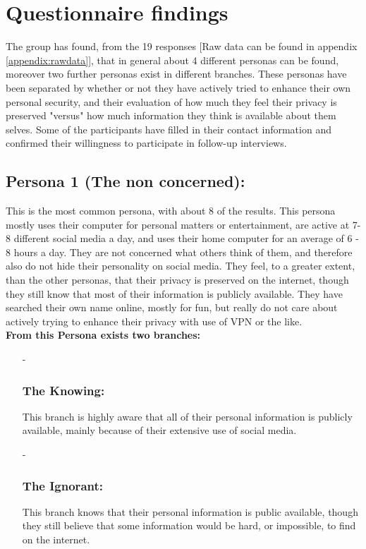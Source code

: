 \section{Questionnaire findings}
The group has found, from the 19 responses  [Raw data can be found in appendix \ref{appendix:rawdata}], that in general about 4 different personas can be found, moreover two further personas exist in different branches. These personas have been separated by whether or not they have actively tried to enhance their own personal security, and their evaluation of how much they feel their privacy is preserved "versus" how much information they think is available about them selves. Some of the participants have filled in their contact information and confirmed their willingness to participate in follow-up interviews.

\subsection{Persona 1 (The non concerned):}
\label{persona1}
This is the most common persona, with about 8 of the results.
This persona mostly uses their computer for personal matters or entertainment, are active at 7-8 different social media a day,
and uses their home computer for an average of 6 - 8 hours a day.
They are not concerned what others think of them, and therefore also do not hide their personality on social media.
They feel, to a greater extent, than the other personas, that their privacy is preserved on the internet, though they still know that most of their information is publicly available.
They have searched their own name online, mostly for fun, but really do not care about actively trying to enhance their privacy with use of VPN or the like.\\

\noindent\textbf{From this Persona exists two branches:}
\begin{itemize}
    \item[-] \subsubsection{The Knowing:}\label{persona11}
    This branch is highly aware that all of their personal information is publicly available, mainly because of their extensive use of social media.
    \item[-] \subsubsection{The Ignorant:}\label{persona12}
    This branch knows that their personal information is public available, though they still believe that some information would be hard, or impossible, to find on the internet.
\end{itemize}

